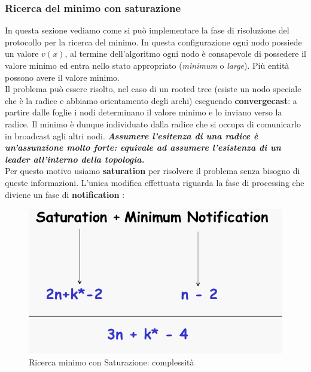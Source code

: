 \documentclass[12pt]{article}
\begin{document}
		\subsubsection{Ricerca del minimo con saturazione}
			In questa sezione vediamo come si può implementare la fase di risoluzione del protocollo per la ricerca del minimo. In questa configurazione ogni nodo possiede un valore $v(x)$, al termine dell'algoritmo ogni nodo è consapevole di possedere il valore minimo ed entra nello stato appropriato (\textit{minimum} o \textit{large}). Più entità possono avere il valore minimo.\\
			Il problema può essere risolto, nel caso di un rooted tree (esiste un nodo speciale che è la radice e abbiamo orientamento degli archi) eseguendo \textbf{convergecast}: a partire dalle foglie i nodi determinano il valore minimo e lo inviano verso la radice. Il minimo è dunque individuato dalla radice che si occupa di comunicarlo in broadcast agli altri nodi. \textbf{\textit{Assumere l'esitenza di una radice è un'assunzione molto forte:  equivale ad assumere l'esistenza di un leader all'interno della topologia.}} \\
			Per questo motivo usiamo \textbf{saturation} per risolvere il problema senza bisogno di queste informazioni. L'unica modifica effettuata riguarda la fase di processing che diviene un fase  di \textbf{notification }:
			\begin{figure}[h!]
				\centering
				\includegraphics[scale=0.3]{img/mincomp.png}
				\caption{Ricerca minimo con Saturazione: complessità}
			\end{figure}
		
\end{document}
